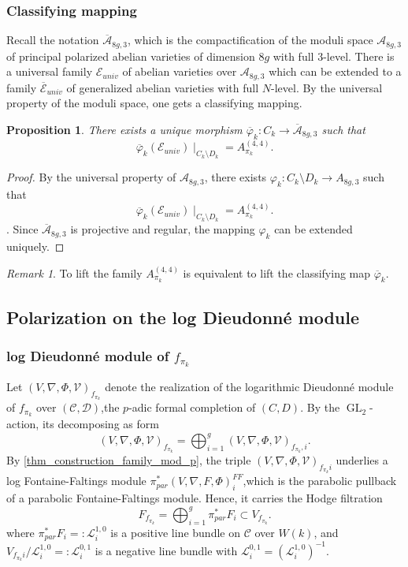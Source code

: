 \documentclass[12pt,twoside]{book}
\theoremstyle{plain}
\newtheorem{proposition}[proposition]{Proposition}
\theoremstyle{definition}
\theoremstyle{remark}
\newtheorem{remark}[remark]{Remark}
\newcommand{\mA}{{\mathcal A}}
\newcommand{\mC}{{\mathcal C}}
\newcommand{\mD}{{\mathcal D}}
\newcommand{\mE}{{\mathcal E}}
\DeclareMathOperator\GL{GL}
\numberwithin{equation}{section}
\begin{document}
\subsubsection{Classifying mapping}
Recall the notation $\overline{\mA}_{8g,3}$, which is the compactification of the moduli space $\mA_{8g,3}$ of principal polarized abelian varieties of dimension $8g$ with full $3$-level. There is a universal family $\mE_{univ}$ of abelian varieties over $\mA_{8g,3}$ which can be extended to a family $\overline{\mE}_{univ}$ of generalized abelian varieties with full $N$-level. By the universal property of the moduli space, one gets a classifying mapping.
\begin{proposition} 
\label{thm_classifying_mapping_k}
There exists a unique morphism $\overline{\varphi}_k\colon C_k \rightarrow \overline{\mA}_{8g,3}$ such that
\[\overline{\varphi}_k(\mE_{univ})\mid_{C_k\setminus D_k} = A^{(4,4)}_{\pi_k}.\]
\end{proposition}
\begin{proof}
By the universal property of $\mA_{8g,3}$, there exists $\varphi_k\colon C_k\setminus D_k \rightarrow A_{8g,3}$ such that
\[\overline{\varphi}_k(\mE_{univ})\mid_{C_k\setminus D_k} = A^{(4,4)}_{\pi_k}.\]
. Since $\overline{\mA}_{8g,3}$ is projective and regular, the mapping $\varphi_k$ can be extended uniquely.
\end{proof}
\begin{remark}
To lift the family $A^{(4,4)}_{\pi_k}$ is equivalent to lift the classifying map $\overline{\varphi}_k$.
\end{remark}

\subsection{Polarization on the log Dieudonn\'e module}
\label{sec_sub_polarization_and_Fil}


\subsubsection{log Dieudonn\'e module of $f_{\pi_k}$}
Let
$(V,\nabla,\Phi,\mathcal V)_{f_{\pi_k}}$ denote the realization of the logarithmic Dieudonn\'e module of $f_{\pi_k}$ over $(\mC,\mD)$,the $p$-adic formal completion of $(C,D)$. By the $\GL_2$-action, its decomposing as form
\[(V,\nabla,\Phi,\mathcal V)_{f_{\pi_k}}=\bigoplus_{i=1}^g(V,\nabla,\Phi,\mathcal V)_{f_{\pi_k},i}.\]
By \autoref{thm_construction_family_mod_p}, the triple $(V,\nabla,\Phi,\mathcal V)_{f_{\pi_k} i}$ underlies a log Fontaine-Faltings module
$\pi_{par}^*(V,\nabla,F, \Phi)^{FF}_i$,which is the parabolic pullback of a parabolic Fontaine-Faltings module. Hence, it carries the Hodge filtration
\[ F_{f_{\pi_k}} = \bigoplus_{i=1}^g \pi_{par}^* F_i \subset V_{f_{\pi_k}}.\]
where $ \pi^*_{par} F_i=: \mathcal L^{1,0}_i$ is a positive line bundle on $\mC$ over $W(k)$, and $V_{f_{\pi_k} i}/\mathcal L^{1,0}_i=:\mathcal L^{0,1}_i$ is a negative line bundle
with $\mathcal L^{0,1}_i=\left(\mathcal L^{1,0}_i\right)^{-1}$.
\end{document}
